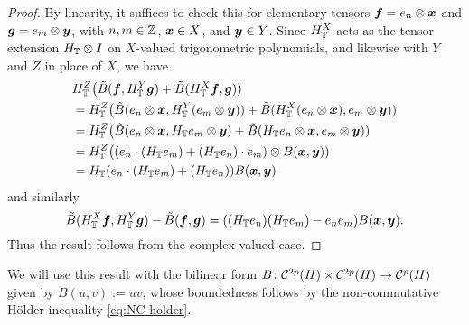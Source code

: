 \begin{proof}
  By linearity, it suffices to check this for elementary tensors $\bm{f} = e_{n} \otimes \bm{x}$ and $\bm{g} = e_{m} \otimes \bm{y}$, with $n,m \in \mathbb{Z}$, $\bm{x} \in X$, and $\bm{y} \in Y$.
  Since $H_{\mathbb{T}}^{X}$ acts as the tensor extension $H_{\mathbb{T}} \otimes I$ on $X$-valued trigonometric polynomials, and likewise with $Y$ and $Z$ in place of $X$, we have
  \begin{equation*}
    \begin{aligned}
      &H_{\mathbb{T}}^{Z}\big(\tilde{B}(\bm{f}, H_{\mathbb{T}}^{Y} \bm{g}) + \tilde{B}(H_{\mathbb{T}}^{X} \bm{f}, \bm{g})) \\
      &= H_{\mathbb{T}}^{Z} \big( \tilde{B}(e_{n} \otimes \bm{x}, H_{\mathbb{T}}^{Y} (e_{m} \otimes \bm{y}) ) + \tilde{B}(H_{\mathbb{T}}^{X} (e_{n} \otimes \bm{x}), e_{m} \otimes \bm{y})) \\
      &= H_{\mathbb{T}}^{Z} \big( \tilde{B}(e_{n} \otimes \bm{x}, H_{\mathbb{T}} e_{m} \otimes \bm{y} ) + \tilde{B}(H_{\mathbb{T}} e_{n} \otimes \bm{x}, e_{m} \otimes \bm{y})) \\
      &= H_{\mathbb{T}}^{Z} \big( (e_{n} \cdot (H_{\mathbb{T}} e_{m}) + (H_{\mathbb{T}} e_{n}) \cdot e_{m} )\otimes B(\bm{x},  \bm{y})) \\
      &= H_{\mathbb{T}}(e_{n} \cdot (H_{\mathbb{T}} e_{m}) + (H_{\mathbb{T}} e_{n})) B(\bm{x}, \bm{y})
    \end{aligned}
  \end{equation*}
  and similarly
  \begin{equation*}
    \tilde{B}(H_{\mathbb{T}}^{X} \bm{f}, H_{\mathbb{T}}^{Y} \bm{g}) - \tilde{B}(\bm{f}, \bm{g})
    = ((H_{\mathbb{T}} e_n)(H_{\mathbb{T}} e_m) - e_n e_m) B(\bm{x},\bm{y}).
  \end{equation*}
  Thus the result follows from the complex-valued case.
\end{proof}

We will use this result with the bilinear form $B \colon \mathcal{C}^{2p}(H) \times \mathcal{C}^{2p}(H) \rightarrow \mathcal{C}^{p}(H)$ given by $B(u,v) := uv$, whose boundedness follows by the non-commutative H\"older inequality \eqref{eq:NC-holder}.

